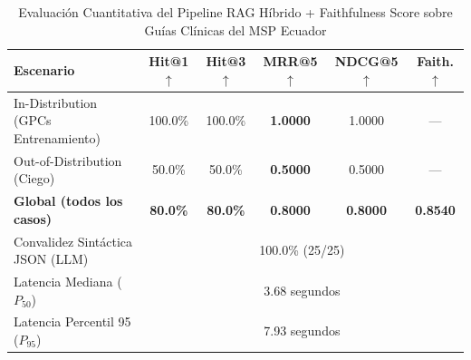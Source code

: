 \begin{table}[htbp]
\centering
\caption{Evaluación Cuantitativa del Pipeline RAG Híbrido + Faithfulness Score sobre Guías Clínicas del MSP Ecuador}
\label{tab:ateneo_rag_results}
\begin{tabular}{lccccc}
\toprule
\textbf{Escenario} & \textbf{Hit@1 $\uparrow$} & \textbf{Hit@3 $\uparrow$} & \textbf{MRR@5 $\uparrow$} & \textbf{NDCG@5 $\uparrow$} & \textbf{Faith. $\uparrow$} \\
\midrule
In-Distribution (GPCs Entrenamiento) & 100.0\% & 100.0\% & \textbf{1.0000} & 1.0000 & --- \\
Out-of-Distribution (Ciego) & 50.0\% & 50.0\% & \textbf{0.5000} & 0.5000 & --- \\
\midrule
\textbf{Global (todos los casos)} & \textbf{80.0\%} & \textbf{80.0\%} & \textbf{0.8000} & \textbf{0.8000} & \textbf{0.8540} \\
\midrule
Convalidez Sintáctica JSON (LLM) & \multicolumn{5}{c}{100.0\% (25/25)} \\
Latencia Mediana ($P_{50}$)     & \multicolumn{5}{c}{3.68 segundos} \\
Latencia Percentil 95 ($P_{95}$) & \multicolumn{5}{c}{7.93 segundos} \\
\bottomrule
\end{tabular}
\end{table}
